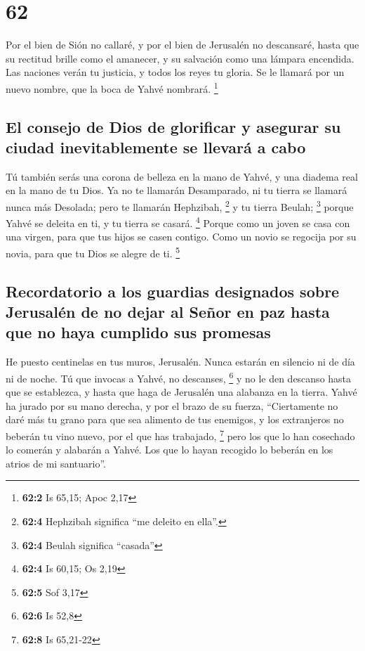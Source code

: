 \hypertarget{section-61}{%
\section{62}\label{section-61}}

 Por el bien de Sión no callaré, y por el bien de
Jerusalén no descansaré, hasta que su rectitud brille como el amanecer,
y su salvación como una lámpara encendida.  Las naciones
verán tu justicia, y todos los reyes tu gloria. Se le llamará por un
nuevo nombre, que la boca de Yahvé nombrará. \footnote{\textbf{62:2} Is
  65,15; Apoc 2,17}

\hypertarget{el-consejo-de-dios-de-glorificar-y-asegurar-su-ciudad-inevitablemente-se-llevaruxe1-a-cabo}{%
\subsection{El consejo de Dios de glorificar y asegurar su ciudad
inevitablemente se llevará a
cabo}\label{el-consejo-de-dios-de-glorificar-y-asegurar-su-ciudad-inevitablemente-se-llevaruxe1-a-cabo}}

 Tú también serás una corona de belleza en la mano de
Yahvé, y una diadema real en la mano de tu Dios.  Ya no te
llamarán Desamparado, ni tu tierra se llamará nunca más Desolada; pero
te llamarán Hephzibah, \footnote{\textbf{62:4} Hephzibah significa ``me
  deleito en ella''.} y tu tierra Beulah; \footnote{\textbf{62:4} Beulah
  significa ``casada''} porque Yahvé se deleita en ti, y tu tierra se
casará. \footnote{\textbf{62:4} Is 60,15; Os 2,19}  Porque
como un joven se casa con una virgen, para que tus hijos se casen
contigo. Como un novio se regocija por su novia, para que tu Dios se
alegre de ti. \footnote{\textbf{62:5} Sof 3,17}

\hypertarget{recordatorio-a-los-guardias-designados-sobre-jerusaluxe9n-de-no-dejar-al-seuxf1or-en-paz-hasta-que-no-haya-cumplido-sus-promesas}{%
\subsection{Recordatorio a los guardias designados sobre Jerusalén de no
dejar al Señor en paz hasta que no haya cumplido sus
promesas}\label{recordatorio-a-los-guardias-designados-sobre-jerusaluxe9n-de-no-dejar-al-seuxf1or-en-paz-hasta-que-no-haya-cumplido-sus-promesas}}

 He puesto centinelas en tus muros, Jerusalén. Nunca
estarán en silencio ni de día ni de noche. Tú que invocas a Yahvé, no
descanses, \footnote{\textbf{62:6} Is 52,8}  y no le den
descanso hasta que se establezca, y hasta que haga de Jerusalén una
alabanza en la tierra.  Yahvé ha jurado por su mano
derecha, y por el brazo de su fuerza, ``Ciertamente no daré más tu grano
para que sea alimento de tus enemigos, y los extranjeros no beberán tu
vino nuevo, por el que has trabajado, \footnote{\textbf{62:8} Is
  65,21-22}  pero los que lo han cosechado lo comerán y
alabarán a Yahvé. Los que lo hayan recogido lo beberán en los atrios de
mi santuario''.

